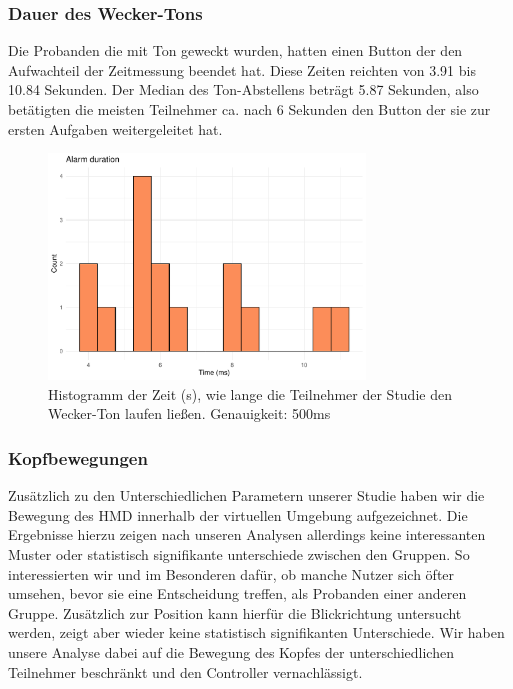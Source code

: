 \subsubsection{Dauer des Wecker-Tons}

Die Probanden die mit Ton geweckt wurden, hatten einen Button der den Aufwachteil der Zeitmessung beendet hat. Diese Zeiten reichten von 3.91 bis 10.84 Sekunden. Der Median des Ton-Abstellens beträgt 5.87 Sekunden, also betätigten die meisten Teilnehmer ca. nach 6 Sekunden den Button der sie zur ersten Aufgaben weitergeleitet hat. 

\begin{figure}[H]
	\centering
	\includegraphics[width=0.75\textwidth]{./_StudyResults/alarmDurationHist}
	\caption{Histogramm der Zeit (s), wie lange die Teilnehmer der Studie den Wecker-Ton laufen ließen. Genauigkeit: 500ms}
	\label{fig:alarmDurationHist}
\end{figure}

\subsubsection{Kopfbewegungen}

Zusätzlich zu den Unterschiedlichen Parametern unserer Studie haben wir die Bewegung des HMD innerhalb der virtuellen Umgebung aufgezeichnet. 
Die Ergebnisse hierzu zeigen nach unseren Analysen allerdings keine interessanten Muster oder statistisch signifikante unterschiede zwischen den Gruppen. 
So interessierten wir und im Besonderen dafür, ob manche Nutzer sich öfter umsehen, bevor sie eine Entscheidung treffen, als Probanden einer anderen Gruppe. 
Zusätzlich zur Position kann hierfür die Blickrichtung untersucht werden, zeigt aber wieder keine statistisch signifikanten Unterschiede.
Wir haben unsere Analyse dabei auf die Bewegung des Kopfes der unterschiedlichen Teilnehmer beschränkt und den Controller vernachlässigt.

